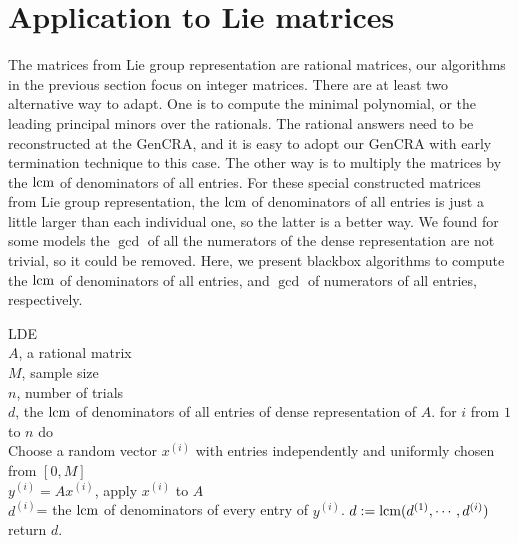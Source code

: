 \section {Application to Lie matrices}
The matrices from Lie group representation are rational matrices,
our algorithms in the previous section focus on integer matrices.
There are at least two alternative way to adapt.
One is to compute the minimal polynomial, or the leading principal minors
over the rationals.
The rational answers need to be reconstructed at the GenCRA,
and it is easy to adopt our GenCRA with early termination technique to
this case.
The other way is to multiply the matrices by the $\mbox{lcm}$ of
denominators of all entries.
For these special constructed matrices from Lie group representation, 
the $\mbox{lcm}$ of denominators of all entries
is just a little larger than each individual one,
so the latter is a better way. 
We found for some models the $\gcd$ of all the
numerators of the dense representation are not trivial,
so it could be removed.
Here, we present blackbox algorithms to compute the
$\mbox{lcm}$ of denominators of all entries, 
and $\gcd$ of numerators of all entries,
respectively.
\begin{algorithm} {LDE}
\Inspec \\
$A$, a rational matrix\\
$M$, sample size\\
$n$, number of trials
\Outspec \\
$d$, the $\mbox{lcm}$ of denominators of all entries of dense representation of $A$.
\Stmt[1.]
for $i$ from $1$ to $n$ do\\
Choose a random vector $x^{(i)}$ with entries independently and uniformly chosen
from $[0, M]$\\
$y^{(i)} = A x^{(i)}$, apply $x^{(i)}$ to $A$\\
$d^{(i)}$= the $\mbox{lcm}$ of denominators of every entry of $y^{(i)}$.
\Stmt[2.]
$d := \mbox{lcm} (d^{(1)}, \cdots, d^{(i)})$
\Stmt[3.]
return $d$.
\end{algorithm}


